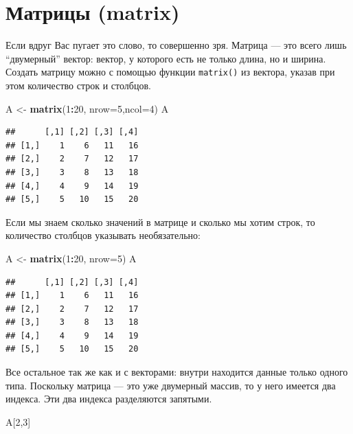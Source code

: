 \documentclass[]{book}
\newenvironment{Shaded}{\begin{snugshade}}{\end{snugshade}}
\newcommand{\DataTypeTok}[1]{\textcolor[rgb]{0.13,0.29,0.53}{#1}}
\newcommand{\DecValTok}[1]{\textcolor[rgb]{0.00,0.00,0.81}{#1}}
\newcommand{\KeywordTok}[1]{\textcolor[rgb]{0.13,0.29,0.53}{\textbf{#1}}}
\newcommand{\NormalTok}[1]{#1}
\newcommand{\OperatorTok}[1]{\textcolor[rgb]{0.81,0.36,0.00}{\textbf{#1}}}
\newcommand{\StringTok}[1]{\textcolor[rgb]{0.31,0.60,0.02}{#1}}
\begin{document}
\hypertarget{matrix}{%
\section{Матрицы (matrix)}\label{matrix}}

Если вдруг Вас пугает это слово, то совершенно зря. Матрица --- это всего лишь ``двумерный'' вектор: вектор, у которого есть не только длина, но и ширина. Создать матрицу можно с помощью функции \texttt{matrix()} из вектора, указав при этом количество строк и столбцов.

\begin{Shaded}
\begin{Highlighting}[]
\NormalTok{A <-}\StringTok{ }\KeywordTok{matrix}\NormalTok{(}\DecValTok{1}\OperatorTok{:}\DecValTok{20}\NormalTok{, }\DataTypeTok{nrow=}\DecValTok{5}\NormalTok{,}\DataTypeTok{ncol=}\DecValTok{4}\NormalTok{)}
\NormalTok{A}
\end{Highlighting}
\end{Shaded}

\begin{verbatim}
##      [,1] [,2] [,3] [,4]
## [1,]    1    6   11   16
## [2,]    2    7   12   17
## [3,]    3    8   13   18
## [4,]    4    9   14   19
## [5,]    5   10   15   20
\end{verbatim}

Если мы знаем сколько значений в матрице и сколько мы хотим строк, то количество столбцов указывать необязательно:

\begin{Shaded}
\begin{Highlighting}[]
\NormalTok{A <-}\StringTok{ }\KeywordTok{matrix}\NormalTok{(}\DecValTok{1}\OperatorTok{:}\DecValTok{20}\NormalTok{, }\DataTypeTok{nrow=}\DecValTok{5}\NormalTok{)}
\NormalTok{A}
\end{Highlighting}
\end{Shaded}

\begin{verbatim}
##      [,1] [,2] [,3] [,4]
## [1,]    1    6   11   16
## [2,]    2    7   12   17
## [3,]    3    8   13   18
## [4,]    4    9   14   19
## [5,]    5   10   15   20
\end{verbatim}

Все остальное так же как и с векторами: внутри находится данные только одного типа. Поскольку матрица --- это уже двумерный массив, то у него имеется два индекса. Эти два индекса разделяются запятыми.

\begin{Shaded}
\begin{Highlighting}[]
\NormalTok{A[}\DecValTok{2}\NormalTok{,}\DecValTok{3}\NormalTok{]}
\end{Highlighting}
\end{Shaded}
\end{document}
